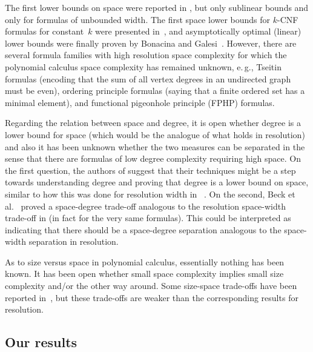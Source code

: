 \documentclass[11pt]{article}
\makeatletter
\numberwithin{equation}{section}
\theoremstyle{definition}
\theoremstyle{plain}
\newcommand{\eg}{e.\,g.}
\theoremstyle{plain}
\theoremstyle{definition}
\newcommand{\etal}{et al.\@\xspace}
\newcommand{\mysubsection}[1]{\subsection{#1}}
\makeatother
\begin{document}
The first lower bounds on space were reported in
\cite{ABRW02SpaceComplexity},
but only sublinear bounds and only for
formulas of unbounded width. The first space lower bounds for
\mbox{$k$-CNF} formulas
%
%
for constant~$k$ were presented in~\cite{FLNRT15SpaceCplx},
and asymptotically optimal (linear) lower bounds
were finally proven by
Bonacina and Galesi~\cite{BG15Framework}.
However, there are several formula families with high resolution space complexity
for which the 
%
polynomial calculus   
space complexity has remained unknown,
%
\eg,     %
Tseitin formulas (encoding
%
that the sum of all vertex
degrees in an undirected graph must be even), 
ordering principle formulas
%
(saying that a finite ordered set has a minimal element),
and 
%
functional pigeonhole principle (FPHP) formulas.

Regarding the relation between space and degree, it is open whether
degree is a lower bound for space 
(which would be the analogue of what holds in resolution)
and also it has been unknown whether the two
measures can be separated in the sense that there are formulas of low
degree complexity requiring high space.
%
On the first question, the authors of \cite{BG15Framework} suggest
that their techniques might be a step towards understanding degree and
proving that degree %
is a lower bound on  %
space, similar to how this was done
for resolution width in~%
\cite{AD08CombinatoricalCharacterization}.
%
On the second, Beck \etal~\cite{BNT13SomeTradeoffs} proved a
space-degree trade-off analogous to the resolution space-width
trade-off in \cite{Ben-Sasson09SizeSpaceTradeoffs} (in fact for the
very same formulas).  This
%
could be interpreted as indicating that there should be a space-degree
separation analogous to the space-width separation in resolution.


As to size versus space in 
%
polynomial calculus,   
essentially nothing has been known.
It 
%
has been 
open whether small space complexity implies small size
complexity and/or the other way around.
Some size-space trade-offs 
%
%
have been
reported in~\cite{BNT13SomeTradeoffs,HN12VirtueSuccinctProofs},
but these trade-offs are weaker than the corresponding results for
resolution. 

\mysubsection{Our results}
\label{sec:intro-our-results}
\end{document}
